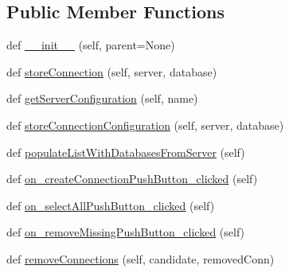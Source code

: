 \subsection*{Public Member Functions}
\begin{DoxyCompactItemize}
\item 
def \mbox{\hyperlink{class_dsg_tools_1_1_server_tools_1_1server_d_b_explorer_1_1_server_d_b_explorer_a4c1f8f2c6b1a632a3c322ebce2a8214b}{\+\_\+\+\_\+init\+\_\+\+\_\+}} (self, parent=None)
\item 
def \mbox{\hyperlink{class_dsg_tools_1_1_server_tools_1_1server_d_b_explorer_1_1_server_d_b_explorer_a7aeedde826e8871d6b9d365a173b4916}{store\+Connection}} (self, server, database)
\item 
def \mbox{\hyperlink{class_dsg_tools_1_1_server_tools_1_1server_d_b_explorer_1_1_server_d_b_explorer_aed0bbfc66b1e9d655c7458335efdac7b}{get\+Server\+Configuration}} (self, name)
\item 
def \mbox{\hyperlink{class_dsg_tools_1_1_server_tools_1_1server_d_b_explorer_1_1_server_d_b_explorer_acae0951876db614c0491d8e83be71bff}{store\+Connection\+Configuration}} (self, server, database)
\item 
def \mbox{\hyperlink{class_dsg_tools_1_1_server_tools_1_1server_d_b_explorer_1_1_server_d_b_explorer_af3736bfe6b6f860696b5efc396fd6842}{populate\+List\+With\+Databases\+From\+Server}} (self)
\item 
def \mbox{\hyperlink{class_dsg_tools_1_1_server_tools_1_1server_d_b_explorer_1_1_server_d_b_explorer_a9e757ff21a7b2ef9fe81e36c239943a6}{on\+\_\+create\+Connection\+Push\+Button\+\_\+clicked}} (self)
\item 
def \mbox{\hyperlink{class_dsg_tools_1_1_server_tools_1_1server_d_b_explorer_1_1_server_d_b_explorer_ae26b603932248d5e50f64d5464d96d9b}{on\+\_\+select\+All\+Push\+Button\+\_\+clicked}} (self)
\item 
def \mbox{\hyperlink{class_dsg_tools_1_1_server_tools_1_1server_d_b_explorer_1_1_server_d_b_explorer_a1e39f8d4e185bf40e252c88be32f5a01}{on\+\_\+remove\+Missing\+Push\+Button\+\_\+clicked}} (self)
\item 
def \mbox{\hyperlink{class_dsg_tools_1_1_server_tools_1_1server_d_b_explorer_1_1_server_d_b_explorer_a36574ae8ee6a72558eee39546b7f1342}{remove\+Connections}} (self, candidate, removed\+Conn)
\end{DoxyCompactItemize}
